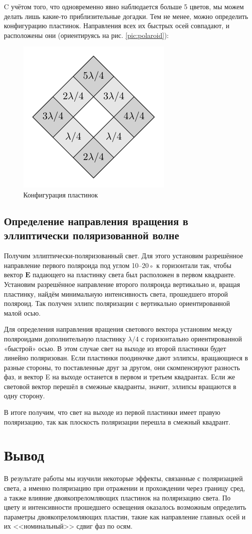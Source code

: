 \documentclass[12pt, a4paper]{article}
\begin{document}
C учётом того, что одновременно явно наблюдается больше 5 цветов, мы можем
делать лишь какие-то приблизительные догадки. Тем не менее, можно определить
конфигурацию пластинок. Направления всех их быстрых осей совпадают, и
расположены они (ориентируясь на рис. \ref{pic:polaroid}):

\begin{figure}[H]
    \includegraphics[width=0.4\linewidth]{plates.pdf}
    \caption{Конфигурация пластинок}
    \label{fig:plates}
\end{figure}

\subsection{Определение направления вращения в эллиптически поляризованной
    волне}
Получим эллиптически-поляризованный свет. Для этого установим разрешённое
направление первого поляроида под углом 10–20◦ к горизонтали так, чтобы вектор
$\mathbf{E}$ падающего на пластинку света был расположен в первом квадранте.
Установим разрешённое направление второго поляроида вертикально и, вращая
пластинку, найдём минимальную интенсивность света, прошедшего второй поляроид.
Так получен эллипс поляризации с вертикально ориентированной малой осью.

Для определения направления вращения светового вектора установим между
поляроидами дополнительную пластинку $\lambda/4$ с горизонтально
ориентированной «быстрой» осью. В этом случае свет на выходе из второй
пластинки будет линейно поляризован. Если пластинки поодиночке дают эллипсы,
вращающиеся в разные стороны, то поставленные друг за другом, они скомпенсируют
разность фаз, и вектор E на выходе останется в первом и третьем квадрантах.
Если же световой вектор перешёл в смежные квадранты, значит, эллипсы вращаются
в одну сторону.

В итоге получим, что свет на выходе из первой пластинки имеет правую
поляризацию, так как плоскость поляризации перешла в смежный квадрант.

\section{Вывод}
В результате работы мы изучили некоторые эффекты, связанные с поляризацией
света, а именно поляризацию при отражении и прохождении через границу сред, а
также влияние двоякопреломляющих пластинок на поляризацию света. По цвету и
интенсивности прошедшего освещения оказалось возможным определить параметры
двоякопреломляющих пластин, такие как направление главных осей и их
<<номинальный>> сдвиг фаз по осям.
\end{document}
